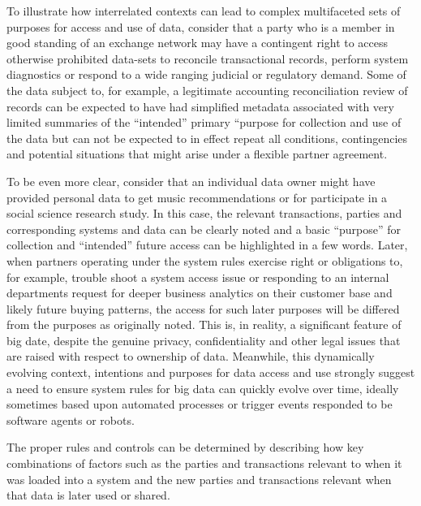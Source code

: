 To illustrate how interrelated contexts can lead to complex multifaceted sets of purposes for access and use of data, consider that a party who is a member in good standing of an exchange network may have a contingent right to access otherwise prohibited data-sets to reconcile transactional records, perform system diagnostics or respond to a wide ranging judicial or regulatory demand. 
Some of the data subject to, for example, a legitimate accounting reconciliation review of records can be expected to have had simplified metadata associated with very limited summaries of the “intended” primary “purpose for collection and use of the data but can not be expected to in effect repeat all conditions, contingencies and potential situations that might arise under a flexible partner agreement.

To be even more clear, consider that an individual data owner might have provided personal data to get music recommendations or for participate in a social science research study.
In this case, the relevant transactions, parties and corresponding systems and data can be clearly noted and a basic “purpose” for collection and “intended” future access can be highlighted in a few words.
Later, when partners operating under the system rules exercise right or obligations to, for example, trouble shoot a system access issue or responding to an internal departments request for deeper business analytics on their customer base and likely future buying patterns, the access for such later purposes will be differed from the purposes as originally noted.
This is, in reality, a significant feature of big date, despite the genuine privacy, confidentiality and other legal issues that are raised with respect to ownership of data.
Meanwhile, this dynamically evolving context, intentions and purposes for data access and use strongly suggest a need to ensure system rules for big data can quickly evolve over time, ideally sometimes based upon automated processes or trigger events responded to be software agents or robots.

The proper rules and controls can be determined by describing how key combinations of factors such as the parties and transactions relevant to when it was loaded into a system and the new parties and transactions relevant when that data is later used or shared.

